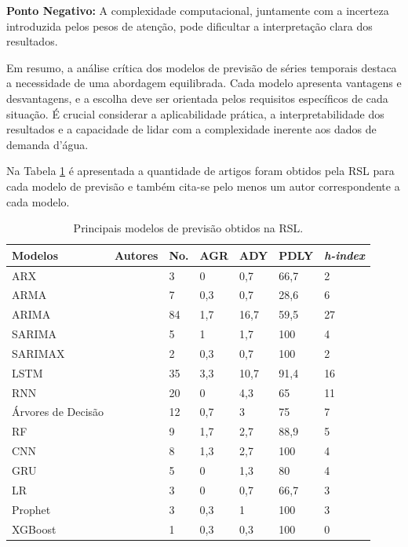 \textbf{Ponto Negativo:} A complexidade computacional, juntamente com a incerteza introduzida pelos pesos de atenção, pode dificultar a interpretação clara dos resultados.

Em resumo, a análise crítica dos modelos de previsão de séries temporais destaca a necessidade de uma abordagem equilibrada. Cada modelo apresenta vantagens e desvantagens, e a escolha deve ser orientada pelos requisitos específicos de cada situação. É crucial considerar a aplicabilidade prática, a interpretabilidade dos resultados e a capacidade de lidar com a complexidade inerente aos dados de demanda d'água.

Na Tabela \ref{tb:mode} é apresentada a quantidade de artigos foram obtidos pela RSL para cada modelo de previsão e também cita-se pelo menos um autor correspondente a cada modelo.

\begin{table}[!htb]
	\centering
	\caption{Principais modelos de previsão obtidos na RSL.}\label{tb:mode}
	\small %
	\begin{tabular}{lllllll}
		\toprule
		Modelos & Autores & No. & AGR & ADY & PDLY & \textit{h-index} \\
		\midrule
		ARX & \citeonline{2-s2.0-85051469381} & 3 & 0 & 0,7 & 66,7 & 2 \\	
		ARMA & \citeonline{2-s2.0-85038637324} & 7 & 0,3 & 0,7 & 28,6 & 6 \\
		ARIMA & \citeonline{2-s2.0-85069459067} & 84 & 1,7 & 16,7 & 59,5 & 27 \\
		SARIMA & \citeonline{2-s2.0-85128561644} & 5 & 1 & 1,7 & 100 & 4 \\
		SARIMAX & \citeonline{2-s2.0-85099424908} & 2 & 0,3 & 0,7 & 100 & 2 \\	
		LSTM & \citeonline{WOS:000529902300014} & 35 & 3,3 & 10,7 & 91,4 & 16 \\
		RNN & \citeonline{2-s2.0-85067419084} & 20 & 0 & 4,3 & 65 & 11 \\
		Árvores de Decisão & \citeonline{2-s2.0-85054695177} & 12 & 0,7 & 3 & 75 & 7 \\
		RF & \citeonline{2-s2.0-85135210428} & 9 & 1,7 & 2,7 & 88,9 & 5 \\
		CNN & \citeonline{WOS:000841076700002} & 8 & 1,3 & 2,7 & 100 & 4 \\
		GRU & \citeonline{2-s2.0-85135210428} & 5 & 0 & 1,3 & 80 & 4 \\
		LR & \citeonline{2-s2.0-85125426780} & 3 & 0 & 0,7 & 66,7 & 3 \\
		Prophet & \citeonline{2-s2.0-85092514286} & 3 & 0,3 & 1 & 100 & 3 \\
		XGBoost & \citeonline{2-s2.0-85130441623} & 1 & 0,3 & 0,3 & 100 & 0 \\
		\bottomrule
	\end{tabular}
\end{table}

